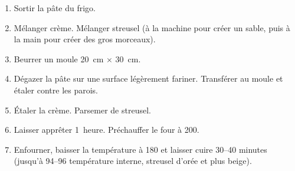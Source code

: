 \begin{recipe}
  \begin{enumerate}

  \item Sortir la pâte du frigo.

  \item Mélanger crème.  Mélanger streusel (à la machine pour créer
    un sable, puis à la main pour créer des gros morceaux).

  \item Beurrer un moule 20~cm $\times$ 30~cm.

  \item Dégazer la pâte sur une surface légèrement fariner.
    Transférer au moule et étaler contre les parois.

  \item Étaler la crème.  Parsemer de streusel.

  \item Laisser apprêter 1~heure.  Préchauffer le four à 200\degreeC.

  \item Enfourner, baisser la température à 180\degreeC{} et laisser
    cuire 30--40 minutes (jusqu'à 94--96\degreeC{} température interne,
    streusel d'orée et plus beige).

  \end{enumerate}
\end{recipe}


